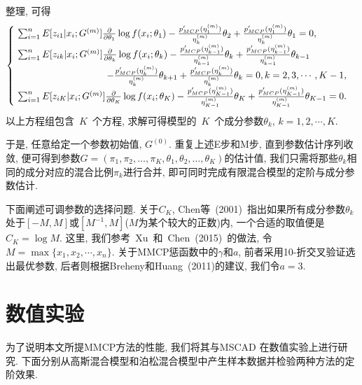 \documentclass[a4paper,12pt,openany,oneside,utf-8]{ctexbook}
\begin{document}
整理, 可得
\[
\begin{cases}
 \ \sum_{i=1}^{n} E[z_{i1}|x_i;G^{(m)}] \frac{\partial}{\partial \theta_1} \log f(x_i; \theta_{1})
   - \frac{p'_{MCP}(\eta_1^{(m)})}{\eta_k^{(m)}}\theta_{2}
   + \frac{p'_{MCP}(\eta_1^{(m)})}{\eta_k^{(m)}}\theta_{1} =0, \\
 \ \sum_{i=1}^{n} E[z_{ik}|x_i;G^{(m)}] \frac{\partial}{\partial \theta_k} \log f(x_i; \theta_{k})
   - \frac{p'_{MCP}(\eta_{k-1}^{(m)})}{\eta_{k-1}^{(m)}}\theta_{k}
   + \frac{p'_{MCP}(\eta_{k-1}^{(m)})}{\eta_{k-1}^{(m)}}\theta_{k-1} \\
   \ \hfill - \frac{p'_{MCP}(\eta_{k}^{(m)})}{\eta_{k}^{(m)}}\theta_{k+1}
   + \frac{p'_{MCP}(\eta_{k}^{(m)})}{\eta_{k}^{(m)}}\theta_{k} =0, k=2, 3, \cdots, K-1, \\
 \ \sum_{i=1}^{n} E[z_{iK}|x_i;G^{(m)}] \frac{\partial}{\partial \theta_K} \log f(x_i; \theta_{K})
   - \frac{p'_{MCP}(\eta_{K-1}^{(m)})}{\eta_{K-1}^{(m)}}\theta_{K}
   + \frac{p'_{MCP}(\eta_{K-1}^{(m)})}{\eta_{K-1}^{(m)}}\theta_{K-1} =0.
\end{cases}
\]
以上方程组包含~$K$~个方程, 求解可得模型的~$K$~个成分参数$\theta_{k}$, $k=1, 2, \cdots, K$.

于是, 任意给定一个参数初始值, $G^{(0)}$. 重复上述E步和M步, 直到参数估计序列收敛, 便可得到参数$G = (\pi_1, \pi_2, \ldots, \pi_K, \theta_1, \theta_2, \ldots, \theta_K)$的估计值, 我们只需将那些$\theta_k$相同的成分对应的混合比例$\pi_k$进行合并, 即可同时完成有限混合模型的定阶与成分参数估计.

下面阐述可调参数的选择问题. 关于$C_{K}$, Chen等~(2001)~指出如果所有成分参数$\theta_k$处于$[-M, M]$或$[M^{-1}, M]$($M$为某个较大的正数)内, 一个合适的取值便是$C_{K}=\log M$. 这里, 我们参考~Xu~和~Chen~(2015)~的做法, 令$M=\max \{x_1, x_2, \cdots, x_n\}$. 关于MMCP惩函数中的$\gamma$和$a$, 前者采用10-折交叉验证选出最优参数, 后者则根据Breheny和Huang~(2011)的建议, 我们令$a=3$.

\section{数值实验}
\label{sec:numerical study to MMCP}
为了说明本文所提MMCP方法的性能, 我们将其与MSCAD 在数值实验上进行研究. 下面分别从高斯混合模型和泊松混合模型中产生样本数据并检验两种方法的定阶效果.
\end{document}

